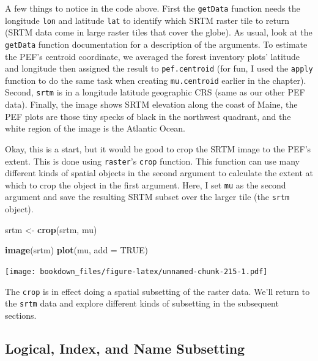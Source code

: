 \documentclass[
]{krantz}
\makeatletter
\newenvironment{Shaded}{\begin{snugshade}}{\end{snugshade}}
\newcommand{\DataTypeTok}[1]{\textcolor[rgb]{0.27,0.27,0.27}{#1}}
\newcommand{\KeywordTok}[1]{\textcolor[rgb]{0.27,0.27,0.27}{\textbf{#1}}}
\newcommand{\NormalTok}[1]{#1}
\newcommand{\OtherTok}[1]{\textcolor[rgb]{0.37,0.37,0.37}{#1}}
\newcommand{\StringTok}[1]{\textcolor[rgb]{0.5,0.5,0.5}{#1}}
\newenvironment{kframe}{%
\medskip{}
\setlength{\fboxsep}{.8em}
 \def\at@end@of@kframe{}%
 \ifinner\ifhmode%
  \def\at@end@of@kframe{\end{minipage}}%
  \begin{minipage}{\columnwidth}%
 \fi\fi%
 \def\FrameCommand##1{\hskip\@totalleftmargin \hskip-\fboxsep
 \colorbox{shadecolor}{##1}\hskip-\fboxsep
     \hskip-\linewidth \hskip-\@totalleftmargin \hskip\columnwidth}%
 \MakeFramed {\advance\hsize-\width
   \@totalleftmargin\z@ \linewidth\hsize
   \@setminipage}}%
 {\par\unskip\endMakeFramed%
 \at@end@of@kframe}
\renewenvironment{Shaded}{\begin{kframe}}{\end{kframe}}
\makeatother
\begin{document}
A few things to notice in the code above. First the \texttt{getData} function needs the longitude \texttt{lon} and latitude \texttt{lat} to identify which SRTM raster tile to return (SRTM data come in large raster tiles that cover the globe). As usual, look at the \texttt{getData} function documentation for a description of the arguments. To estimate the PEF's centroid coordinate, we averaged the forest inventory plots' latitude and longitude then assigned the result to \texttt{pef.centroid} (for fun, I used the \texttt{apply} function to do the same task when creating \texttt{mu.centroid} earlier in the chapter). Second, \texttt{srtm} is in a longitude latitude geographic CRS (same as our other PEF data). Finally, the image shows SRTM elevation along the coast of Maine, the PEF plots are those tiny specks of black in the northwest quadrant, and the white region of the image is the Atlantic Ocean.

Okay, this is a start, but it would be good to crop the SRTM image to the PEF's extent. This is done using \texttt{raster}'s \texttt{crop} function. This function can use many different kinds of spatial objects in the second argument to calculate the extent at which to crop the object in the first argument. Here, I set \texttt{mu} as the second argument and save the resulting SRTM subset over the larger tile (the \texttt{srtm} object).

\begin{Shaded}
\begin{Highlighting}[]
\NormalTok{srtm \textless{}{-}}\StringTok{ }\KeywordTok{crop}\NormalTok{(srtm, mu)}

\KeywordTok{image}\NormalTok{(srtm)}
\KeywordTok{plot}\NormalTok{(mu, }\DataTypeTok{add =} \OtherTok{TRUE}\NormalTok{)}
\end{Highlighting}
\end{Shaded}

\texttt{[image: bookdown\_files/figure-latex/unnamed-chunk-215-1.pdf]}

The \texttt{crop} is in effect doing a spatial subsetting of the raster data. We'll return to the \texttt{srtm} data and explore different kinds of subsetting in the subsequent sections.

\hypertarget{logical-index-and-name-subsetting}{%
\subsection{Logical, Index, and Name Subsetting}\label{logical-index-and-name-subsetting}}
\end{document}
